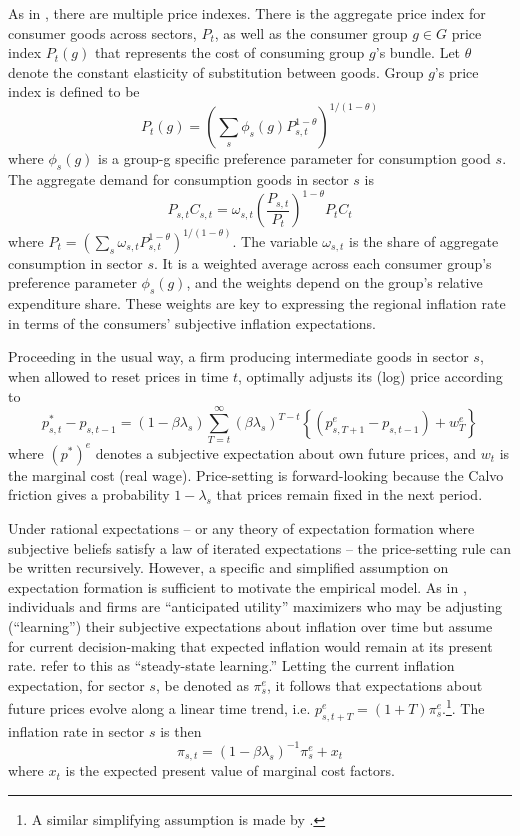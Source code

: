 \documentclass[12pt]{article}
\begin{document}
As in \cite{Cravinoetal:JME2020}, there are multiple price indexes. There is the aggregate price index for consumer goods across sectors, $P_t$, as well as the consumer group $g\in G$ price index $P_t(g)$ that represents the cost of consuming group $g$'s bundle. Let $\theta$ denote the constant elasticity of substitution between goods. Group $g$'s price index is defined to be
$$ P_t(g) = \left( \sum_s \phi_s(g)P^{1-\theta}_{s,t}\right)^{1/(1-\theta)}$$
where $\phi_s(g)$ is a group-g specific preference parameter for consumption good $s$. The aggregate demand for consumption goods in sector $s$ is
$$ P_{s,t}C_{s,t} = \omega_{s,t}\left(\frac{P_{s,t}}{P_t}\right)^{1-\theta} P_tC_t$$
where $P_t=\left(\sum_s\omega_{s,t}P_{s,t}^{1-\theta}\right)^{1/(1-\theta)}$. The variable $\omega_{s,t}$ is the share of aggregate consumption in sector $s$. It is a weighted average across each consumer group's preference parameter $\phi_s(g)$, and the weights depend on the group's relative expenditure share. These weights are key to expressing the regional inflation rate in terms of the consumers' subjective inflation expectations.

Proceeding in the usual way, a firm producing intermediate goods in sector $s$, when allowed to reset prices in time $t$, optimally adjusts its (log) price according to
$$p^*_{s,t} - p_{s,t-1}= \left( 1-\beta\lambda_s\right)\sum_{T=t}^{\infty}\left(\beta\lambda_s\right)^{T-t}\left\{ \left(p^e_{s,T+1}-p_{s,t-1}\right) + w^e_{T}\right\}$$
where $(p^*)^e$ denotes a subjective expectation about own future prices, and $w_t$ is the marginal cost (real wage). Price-setting is forward-looking because the Calvo friction gives a probability $1-\lambda_s$ that prices remain fixed in the next period.  

Under rational expectations -- or any theory of expectation formation where subjective beliefs satisfy a law of iterated expectations -- the price-setting rule can be written recursively. However, a specific and simplified assumption on expectation formation is sufficient to motivate the empirical model. As in \cite{Woodford:annualreview}, individuals and firms are ``anticipated utility'' maximizers who may be adjusting (``learning'') their subjective expectations about inflation over time but assume for current decision-making that expected inflation would remain at its present rate. \cite{EvansHonkap-book} refer to this as ``steady-state learning.'' Letting the current inflation expectation, for sector $s$, be denoted as $\pi^e_s$, it follows that expectations about future prices evolve along a linear time trend, i.e. $p^e_{s,t+T} = (1+T)\pi^e_s$.\footnote{A similar simplifying assumption is made by \cite{Werning:expectsWP}.}. The inflation rate in sector $s$ is then
\begin{equation}\label{secPC}
 \pi_{s,t} = \left(1-\beta\lambda_s\right)^{-1} \pi^e_{s} + x_t
 \end{equation}
where $x_t$ is the expected present value of marginal cost factors.
\end{document}
